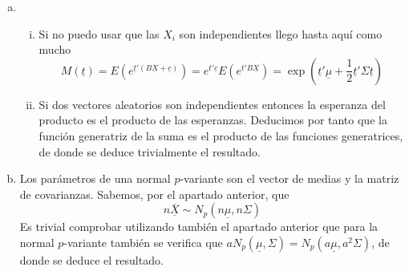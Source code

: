 \documentclass[twoside]{article}
\newcommand{\media}[1]{{\overline{#1}}}
\newcommand{\muestra}[1]{{\underline{#1}}}
\newcommand{\m}[1]{{\muestra{#1}}}
\newcommand{\mX}{{\muestra{X}}}
\begin{document}
\begin{solucion}
\begin{enumerate}[(a)]
\item 
\begin{enumerate}[i.]
\item Si no puedo usar que las $X_i$ son independientes llego hasta aquí como mucho
\[ M(\m{t}) = E\left(e^{\m{t}'(B\mX+\muestra{c})}\right) = e^{t'\muestra{c}}E\left(e^{t'B\mX}\right) = \exp\left(\m{t}'\m{μ} + \frac{1}{2}\m{t}'Σ\m{t}\right)\]
\item Si dos vectores aleatorios son independientes entonces la esperanza del producto es el producto de las esperanzas. Deducimos por tanto que la función generatriz de la suma es el producto de las funciones generatrices, de donde se deduce trivialmente el resultado.
\end{enumerate}
\item Los parámetros de una normal $p$-variante son el vector de medias y la matriz de covarianzas. Sabemos, por el apartado anterior, que 
$$
n\media{\mX}\sim N_p(n\muestra{\mu},n\Sigma)
$$
Es trivial comprobar utilizando también el apartado anterior que para la normal $p$-variante también se verifica que $a N_p(\muestra{\mu},\Sigma)= N_p(a\muestra{\mu},a^2\Sigma)$, de donde se deduce el resultado.
\end{enumerate}
\end{solucion}
\newpage
\end{document}
